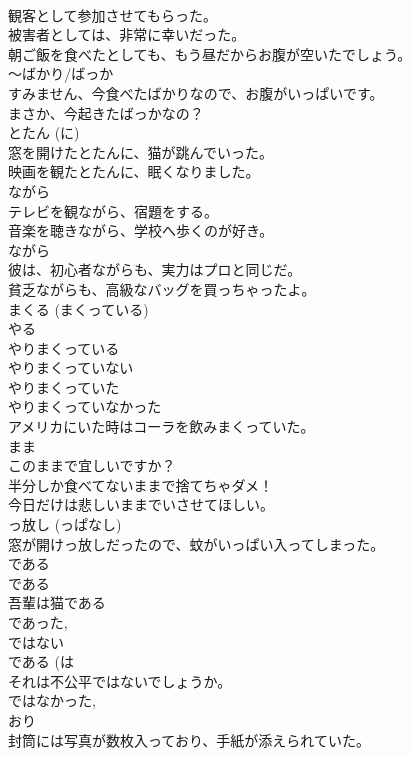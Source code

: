 \documentclass[8pt]{extreport}
\begin{document}
\begin{CJK}{UTF8}{min}
\\	観客として参加させてもらった。
\\	被害者としては、非常に幸いだった。
\\	朝ご飯を食べたとしても、もう昼だからお腹が空いたでしょう。 
\\	〜ばかり/ばっか	
\\	すみません、今食べたばかりなので、お腹がいっぱいです。
\\	まさか、今起きたばっかなの？
\\	とたん (に)	
\\	窓を開けたとたんに、猫が跳んでいった。
\\	映画を観たとたんに、眠くなりました。
\\	ながら	
\\	テレビを観ながら、宿題をする。
\\	音楽を聴きながら、学校へ歩くのが好き。
\\	ながら	
\\	彼は、初心者ながらも、実力はプロと同じだ。
\\	貧乏ながらも、高級なバッグを買っちゃったよ。
\\	まくる (まくっている)	
\\	やる　
\\	やりまくっている 
\\	やりまくっていない 
\\	やりまくっていた 
\\	やりまくっていなかった 
\\	アメリカにいた時はコーラを飲みまくっていた。
\\	まま	
\\	このままで宜しいですか？ 
\\	半分しか食べてないままで捨てちゃダメ！ 
\\	今日だけは悲しいままでいさせてほしい。
\\	っ放し (っぱなし)	
\\	窓が開けっ放しだったので、蚊がいっぱい入ってしまった。
\\	である
\\	である 
\\	吾輩は猫である  
\\	であった,
\\	ではない	
\\	である (は 
\\	それは不公平ではないでしょうか。
\\	ではなかった, 
\\	おり	
\\	封筒には写真が数枚入っており、手紙が添えられていた。

\end{CJK}
\end{document}
